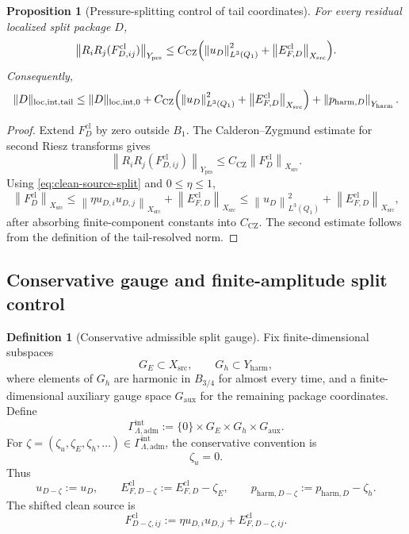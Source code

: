 \documentclass[11pt]{article}
\numberwithin{equation}{section}
\newtheorem{proposition}[proposition]{Proposition}
\theoremstyle{definition}
\newtheorem{definition}[definition]{Definition}
\theoremstyle{remark}
\newcommand{\loc}{\mathrm{loc}}
\newcommand{\intg}{\mathrm{int}}
\newcommand{\tail}{\mathrm{tail}}
\newcommand{\adm}{\mathrm{adm}}
\newcommand{\prs}{\mathrm{prs}}
\newcommand{\harm}{\mathrm{harm}}
\newcommand{\src}{\mathrm{src}}
\newcommand{\cl}{\mathrm{cl}}
\newcommand{\CZ}{\mathrm{CZ}}
\newcommand{\aux}{\mathrm{aux}}
\newcommand{\norm}[2]{\left\|#1\right\|_{#2}}
\newcommand{\Gammaadm}{\Gamma^{\intg}_{\Lambda,\adm}}
\begin{document}
\begin{proposition}[Pressure-splitting control of tail coordinates]\label{prop:pressure-splitting-control}
For every residual localized split package $D$,
\begin{equation}\label{eq:pressure-splitting-control}
\norm{R_iR_j(F^{\cl}_{D,ij})}{Y_{\prs}}
\le
C_{\CZ}
\Bigl(
\norm{u_D}{L^3(Q_1)}^2+
\norm{E^{\cl}_{F,D}}{X_{\src}}
\Bigr).
\end{equation}
Consequently,
\[
\|D\|_{\loc,\intg,\tail}
\le
\|D\|_{\loc,\intg,0}
+C_{\CZ}
\Bigl(
\norm{u_D}{L^3(Q_1)}^2+
\norm{E^{\cl}_{F,D}}{X_{\src}}
\Bigr)
+
\norm{p_{\harm,D}}{Y_{\harm}}.
\]
\end{proposition}

\begin{proof}
Extend $F^{\cl}_D$ by zero outside $B_1$.  The Calderon--Zygmund estimate for second
Riesz transforms gives
\[
\norm{R_iR_j(F^{\cl}_{D,ij})}{Y_{\prs}}
\le
C_{\CZ}\norm{F^{\cl}_D}{X_{\src}}.
\]
Using \eqref{eq:clean-source-split} and $0\le\eta\le1$,
\[
\norm{F^{\cl}_D}{X_{\src}}
\le
\norm{\eta u_{D,i}u_{D,j}}{X_{\src}}+
\norm{E^{\cl}_{F,D}}{X_{\src}}
\le
\norm{u_D}{L^3(Q_1)}^2+
\norm{E^{\cl}_{F,D}}{X_{\src}},
\]
after absorbing finite-component constants into $C_{\CZ}$.  The second estimate follows
from the definition of the tail-resolved norm.
\end{proof}

\subsection{Conservative gauge and finite-amplitude split control}
\label{sec:split-control}

\begin{definition}[Conservative admissible split gauge]\label{def:conservative-gauge}
Fix finite-dimensional subspaces
\[
        G_E\subset X_{\src},
        \qquad
        G_h\subset Y_{\harm},
\]
where elements of $G_h$ are harmonic in $B_{3/4}$ for almost every time, and a finite-dimensional
auxiliary gauge space $G_{\aux}$ for the remaining package coordinates.  Define
\[
        \Gammaadm:=\{0\}\times G_E\times G_h\times G_{\aux}.
\]
For $\zeta=(\zeta_u,\zeta_E,\zeta_h,\ldots)\in\Gammaadm$, the conservative convention is
\[
        \zeta_u=0.
\]
Thus
\[
        u_{D-\zeta}:=u_D,
        \qquad
        E^{\cl}_{F,D-\zeta}:=E^{\cl}_{F,D}-\zeta_E,
        \qquad
        p_{\harm,D-\zeta}:=p_{\harm,D}-\zeta_h.
\]
The shifted clean source is
\[
        F^{\cl}_{D-\zeta,ij}:=\eta u_{D,i}u_{D,j}+E^{\cl}_{F,D-\zeta,ij}.
\]
\end{definition}
\end{document}
